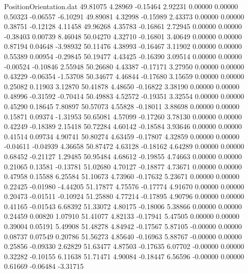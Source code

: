 \begin{filecontents}{PositionOrientation.dat}
  49.81075    4.28969   -0.15464     2.92231    0.00000    0.00000    0.50323   -0.06557   -6.10291
  49.89081    4.32998   -0.15989     2.43373    0.00000    0.00000    0.38751   -0.12128    4.11458
  49.96268    4.35783   -0.16861     2.72945    0.00000    0.00000   -0.38403    0.00739    8.46048
  50.04270    4.32710   -0.16801     3.40649    0.00000    0.00000    0.87194    0.04648   -3.98932
  50.11476    4.38993   -0.16467     3.11902    0.00000    0.00000    0.55389    0.00954   -0.29845
  50.19477    4.43425   -0.16390     3.09514    0.00000    0.00000   -0.00524   -0.10846    2.55948
  50.26680    4.43387   -0.17171     3.27950    0.00000    0.00000    0.43229   -0.06354   -1.53708
  50.34677    4.46844   -0.17680     3.15659    0.00000    0.00000    0.25082    0.11903    3.12870
  50.41878    4.48650   -0.16822     3.38190    0.00000    0.00000    0.48996   -0.31592   -0.70414
  50.49883    4.52572   -0.19351     3.32554    0.00000    0.00000    0.45290    0.18645    7.80897
  50.57073    4.55828   -0.18011     3.88698    0.00000    0.00000    0.15871    0.09374   -1.31953
  50.65081    4.57099   -0.17260     3.78130    0.00000    0.00000    0.42249   -0.18389    2.15418
  50.72284    4.60142   -0.18584     3.93646    0.00000    0.00000    0.41514    0.09734    4.90741
  50.80274    4.63459   -0.17807     4.32859    0.00000    0.00000   -0.04611   -0.04939    4.36658
  50.87472    4.63128   -0.18162     4.64289    0.00000    0.00000    0.68452   -0.21127    1.29485
  50.95484    4.68612   -0.19855     4.74663    0.00000    0.00000    0.21065    0.13581   -0.13781
  51.02680    4.70127   -0.18877     4.73671    0.00000    0.00000    0.47958    0.15588    6.25584
  51.10673    4.73960   -0.17632     5.23671    0.00000    0.00000    0.22425   -0.01980   -4.44205
  51.17877    4.75576   -0.17774     4.91670    0.00000    0.00000    0.20473   -0.01511   -0.10924
  51.25880    4.77214   -0.17895     4.90796    0.00000    0.00000    0.41165   -0.01543    6.68392
  51.33072    4.80175   -0.18006     5.38866    0.00000    0.00000    0.24459    0.00820    1.07910
  51.41077    4.82133   -0.17941     5.47505    0.00000    0.00000    0.39004    0.05191    5.49908
  51.48278    4.84942   -0.17567     5.87105   -0.00000    0.00000    0.08737    0.07549    0.20786
  51.56273    4.85640   -0.16963     5.88767   -0.00000    0.00000    0.25856   -0.09330    2.62829
  51.63477    4.87503   -0.17635     6.07702   -0.00000    0.00000    0.32282   -0.10155    6.11638
  51.71471    4.90084   -0.18447     6.56596   -0.00000    0.00000    0.61669   -0.06484   -3.31715

\end{filecontents}
